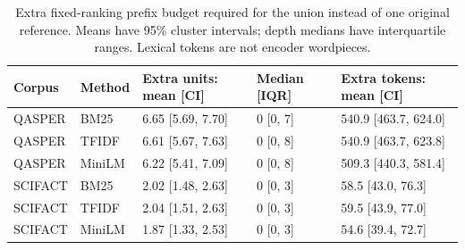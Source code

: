 \begin{table}[htbp]\centering\small\caption{Extra fixed-ranking prefix budget required for the union instead of one original reference. Means have 95\% cluster intervals; depth medians have interquartile ranges. Lexical tokens are not encoder wordpieces.}
\begin{tabular}{p{53pt}p{37pt}p{100pt}p{67pt}p{115pt}}
\toprule
Corpus & Method & Extra units: mean [CI] & Median [IQR] & Extra tokens: mean [CI] \\
\midrule
QASPER & BM25 & 6.65 [5.69, 7.70] & 0 [0, 7] & 540.9 [463.7, 624.0] \\
QASPER & TFIDF & 6.61 [5.67, 7.63] & 0 [0, 8] & 540.9 [463.7, 623.8] \\
QASPER & MiniLM & 6.22 [5.41, 7.09] & 0 [0, 8] & 509.3 [440.3, 581.4] \\
SCIFACT & BM25 & 2.02 [1.48, 2.63] & 0 [0, 3] & 58.5 [43.0, 76.3] \\
SCIFACT & TFIDF & 2.04 [1.51, 2.63] & 0 [0, 3] & 59.5 [43.9, 77.0] \\
SCIFACT & MiniLM & 1.87 [1.33, 2.53] & 0 [0, 3] & 54.6 [39.4, 72.7] \\
\bottomrule\end{tabular}\end{table}
